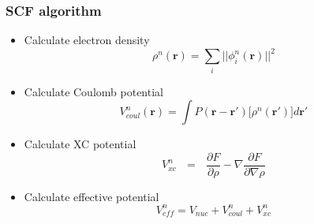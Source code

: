 \documentclass[mathserif]{beamer}
\begin{document}

\begin{frame}
    \frametitle{SCF algorithm}
    \begin{itemize}
	\pause
	\item Calculate electron density
	    \begin{equation}
		\nonumber
		\rho^n(\boldsymbol{r}) = \sum_i ||\phi^n_i(\boldsymbol{r})||^2
	    \end{equation}
	\pause
	\item Calculate Coulomb potential
	    \begin{equation}
		\nonumber
		V^n_{coul}(\boldsymbol{r}) = 
		\int P(\boldsymbol{r} - \boldsymbol{r}') 
		\Big[ \rho^n(\boldsymbol{r}')\Big] d\boldsymbol{r}'
	    \end{equation}
	\pause
	\item Calculate XC potential
	    \begin{equation}
		\nonumber
		V^n_{xc} \ \ \ = \ \ \ \frac{\partial F}{\partial \rho} - 
		    \nabla \frac{\partial F}{\partial \nabla \rho}
	    \end{equation}
	\pause
	\item Calculate effective potential
	    \begin{equation}
		\nonumber
		V^n_{eff} = V_{nuc} + V^n_{coul} + V^n_{xc}
	    \end{equation}
    \end{itemize}
\end{frame}
\end{document}
